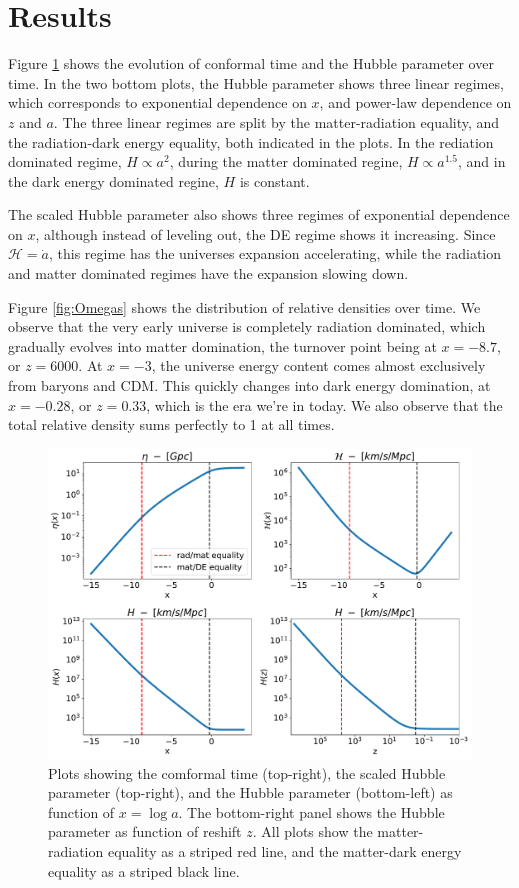 \documentclass[10pt, a4paper]{article}
\begin{document}
\section{Results}
Figure \ref{fig:H} shows the evolution of conformal time and the Hubble parameter over time. In the two bottom plots, the Hubble parameter shows three linear regimes, which corresponds to exponential dependence on $x$, and power-law dependence on $z$ and $a$. The three linear regimes are split by the matter-radiation equality, and the radiation-dark energy equality, both indicated in the plots. In the rediation dominated regime, $H \propto a^2$, during the matter dominated regine, $H \propto a^{1.5}$, and in the dark energy dominated regine, $H$ is constant.

The scaled Hubble parameter also shows three regimes of exponential dependence on $x$, although instead of leveling out, the DE regime shows it increasing. Since $\mathcal{H} = \dot{a}$, this regime has the universes expansion accelerating, while the radiation and matter dominated regimes have the expansion slowing down.

Figure \ref{fig:Omegas} shows the distribution of relative densities over time. We observe that the very early universe is completely radiation dominated, which gradually evolves into matter domination, the turnover point being at $x=-8.7$, or $z=6000$. At $x=-3$, the universe energy content comes almost exclusively from baryons and CDM. This quickly changes into dark energy domination, at $x=-0.28$, or $z=0.33$, which is the era we're in today. We also observe that the total relative density sums perfectly to 1 at all times.



\begin{figure}[H]
    \centering
    \includegraphics[scale=0.5]{../m1_figs/H.pdf}
    \caption{Plots showing the comformal time (top-right), the scaled Hubble parameter (top-right), and the Hubble parameter (bottom-left) as function of $x=\log{a}$. The bottom-right panel shows the Hubble parameter as function of reshift $z$. All plots show the matter-radiation equality as a striped red line, and the matter-dark energy equality as a striped black line.}
    \label{fig:H}
\end{figure}
\end{document}
